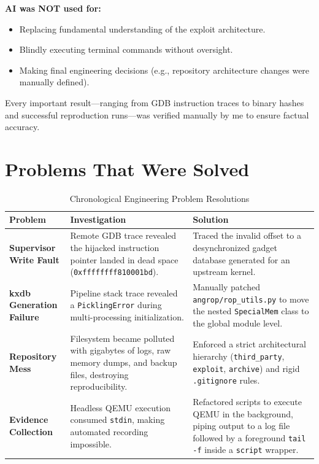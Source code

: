 \documentclass[11pt,a4paper]{article}
\begin{document}
\textbf{AI was NOT used for:}
\begin{itemize}
    \item Replacing fundamental understanding of the exploit architecture.
    \item Blindly executing terminal commands without oversight.
    \item Making final engineering decisions (e.g., repository architecture changes were manually defined).
\end{itemize}

Every important result---ranging from GDB instruction traces to binary hashes and successful reproduction runs---was verified manually by me to ensure factual accuracy.

\clearpage

\section{Problems That Were Solved}
\begin{table}[H]
    \centering
    \begin{tabular}{|p{4cm}|p{5cm}|p{5cm}|}
    \hline
    \textbf{Problem} & \textbf{Investigation} & \textbf{Solution} \\
    \hline
    \textbf{Supervisor Write Fault} & Remote GDB trace revealed the hijacked instruction pointer landed in dead space (\texttt{0xffffffff810001bd}). & Traced the invalid offset to a desynchronized gadget database generated for an upstream kernel. \\
    \hline
    \textbf{kxdb Generation Failure} & Pipeline stack trace revealed a \texttt{PicklingError} during multi-processing initialization. & Manually patched \texttt{angrop/rop\_utils.py} to move the nested \texttt{SpecialMem} class to the global module level. \\
    \hline
    \textbf{Repository Mess} & Filesystem became polluted with gigabytes of logs, raw memory dumps, and backup files, destroying reproducibility. & Enforced a strict architectural hierarchy (\texttt{third\_party}, \texttt{exploit}, \texttt{archive}) and rigid \texttt{.gitignore} rules. \\
    \hline
    \textbf{Evidence Collection} & Headless QEMU execution consumed \texttt{stdin}, making automated recording impossible. & Refactored scripts to execute QEMU in the background, piping output to a log file followed by a foreground \texttt{tail -f} inside a \texttt{script} wrapper. \\
    \hline
    \end{tabular}
    \caption{Chronological Engineering Problem Resolutions}
\end{table}
\end{document}
